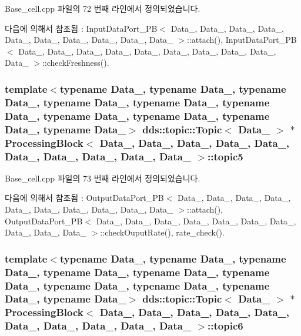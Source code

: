 Base\+\_\+cell.\+cpp 파일의 72 번째 라인에서 정의되었습니다.



다음에 의해서 참조됨 \+:  Input\+Data\+Port\+\_\+\+P\+B$<$ Data\+\_, Data\+\_, Data\+\_, Data\+\_, Data\+\_, Data\+\_, Data\+\_, Data\+\_, Data\+\_, Data\+\_ $>$\+::attach(), Input\+Data\+Port\+\_\+\+P\+B$<$ Data\+\_, Data\+\_, Data\+\_, Data\+\_, Data\+\_, Data\+\_, Data\+\_, Data\+\_, Data\+\_, Data\+\_ $>$\+::check\+Freshness().

\subsubsection[{\texorpdfstring{topic5}{topic5}}]{\setlength{\rightskip}{0pt plus 5cm}template$<$typename Data\+\_, typename Data\+\_, typename Data\+\_, typename Data\+\_, typename Data\+\_, typename Data\+\_, typename Data\+\_, typename Data\+\_, typename Data\+\_, typename Data\+\_$>$ dds\+::topic\+::\+Topic$<$ Data\+\_ $>$ $\ast$ {\bf Processing\+Block}$<$ Data\+\_, Data\+\_, Data\+\_, Data\+\_, Data\+\_, Data\+\_, Data\+\_, Data\+\_, Data\+\_, Data\+\_ $>$\+::topic5}\hypertarget{classProcessingBlock_a8d76712e54b3d59cad11c796680d0ef2}{}\label{classProcessingBlock_a8d76712e54b3d59cad11c796680d0ef2}


Base\+\_\+cell.\+cpp 파일의 73 번째 라인에서 정의되었습니다.



다음에 의해서 참조됨 \+:  Output\+Data\+Port\+\_\+\+P\+B$<$ Data\+\_, Data\+\_, Data\+\_, Data\+\_, Data\+\_, Data\+\_, Data\+\_, Data\+\_, Data\+\_, Data\+\_ $>$\+::attach(), Output\+Data\+Port\+\_\+\+P\+B$<$ Data\+\_, Data\+\_, Data\+\_, Data\+\_, Data\+\_, Data\+\_, Data\+\_, Data\+\_, Data\+\_, Data\+\_ $>$\+::check\+Ouput\+Rate(), rate\+\_\+check().

\subsubsection[{\texorpdfstring{topic6}{topic6}}]{\setlength{\rightskip}{0pt plus 5cm}template$<$typename Data\+\_, typename Data\+\_, typename Data\+\_, typename Data\+\_, typename Data\+\_, typename Data\+\_, typename Data\+\_, typename Data\+\_, typename Data\+\_, typename Data\+\_$>$ dds\+::topic\+::\+Topic$<$ Data\+\_ $>$ $\ast$ {\bf Processing\+Block}$<$ Data\+\_, Data\+\_, Data\+\_, Data\+\_, Data\+\_, Data\+\_, Data\+\_, Data\+\_, Data\+\_, Data\+\_ $>$\+::topic6}\hypertarget{classProcessingBlock_a5e0dba92ddf83623776beb095de4b960}{}\label{classProcessingBlock_a5e0dba92ddf83623776beb095de4b960}


